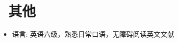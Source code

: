 \documentclass{resume}
\begin{document}

\section{\faInfo\ 其他}
\begin{itemize}[parsep=0.5ex]
  \item 语言: 英语六级，熟悉日常口语，无障碍阅读英文文献
\end{itemize}

%
%
\end{document}
